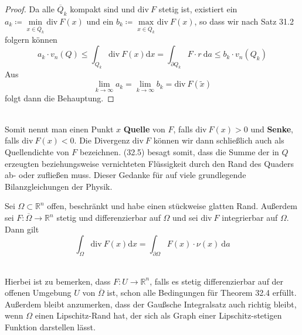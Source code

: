 \begin{proof}
Da alle $\overline{Q}_k$ kompakt sind und $\mathrm{div\ }F$ stetig ist, existiert ein $a_k\coloneqq\min\limits_{x\in\overline{Q}_k}\mathrm{div\ }F(x)$ und ein $b_k\coloneqq\max\limits_{x\in\overline{Q}_k}\mathrm{div\ }F(x)$, so dass 
wir nach Satz 31.2 folgern können
\begin{equation*}
	a_k\cdot v_n(Q)\leq\int_{Q_k}\mathrm{div\ }F(x)\mathrm{d}x 	= \int_{\partial Q_k}F\cdot r \ \mathrm{d}a \leq 
	b_k\cdot v_n(Q_k)
 \end{equation*}
Aus 
\begin{equation*}
	\lim\limits_{k\rightarrow\infty} a_k = 
	\lim\limits_{k\rightarrow\infty} b_k = 
	\mathrm{div\ }F(\tilde{x})
\end{equation*}
folgt dann die Behauptung.
\end{proof}
\ \\
\linebreak
Somit nennt man einen Punkt $x$ \textbf{Quelle} von $F$, falls 
$\mathrm{div\ }F(x)>0$ und \textbf{Senke}, falls $\mathrm{div\ }F(x)<0$. Die Divergenz $\mathrm{div\ }F$ können wir dann 
schließlich auch als Quellendichte von $F$ bezeichnen. (32.5) 
besagt somit, dass die Summe der in $Q$ erzeugten 
beziehungsweise vernichteten Flüssigkeit durch den Rand des 
Quaders ab- oder zufließen muss. Dieser Gedanke für auf viele 
grundlegende Bilanzgleichungen der Physik. 
\newpage
\begin{theorem}
Sei $\Omega\subset\mathbb{R}^n$ offen, beschränkt und habe 
einen stückweise glatten Rand. Außerdem sei $F:\overline{\Omega} 
\rightarrow\mathbb{R}^n$ stetig und differenzierbar auf $\Omega$ und sei $\mathrm{div\ }F$ integrierbar auf $\Omega$. 
Dann gilt
\begin{equation}
	\int_\Omega\mathrm{div\ }F(x)\mathrm{d}x = 
	\int_{\partial\Omega}F(x)\cdot\nu(x)\ \mathrm{d}a
\end{equation}
\end{theorem}
\ \\
Hierbei ist zu bemerken, dass $F:U\rightarrow\mathbb{R}^n$, 
falls es stetig differenzierbar auf der offenen Umgebung $U$ 
von $\overline{\Omega}$ ist, schon alle Bedingungen für 
Theorem 32.4 erfüllt. \\
Außerdem bleibt anzumerken, dass der Gaußsche Integralsatz 
auch richtig bleibt, wenn $\Omega$ einen Lipschitz-Rand hat, 
der sich als Graph einer Lipschitz-stetigen Funktion 
darstellen lässt.\\
\linebreak

